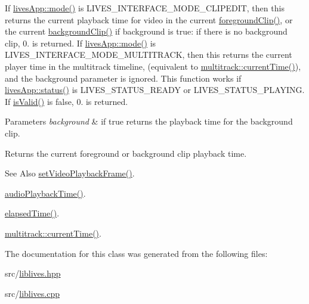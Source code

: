 If \hyperlink{classlives_1_1livesApp_aafa7b7f9c2666d097d0413e84bf4eccc}{lives\-App\-::mode()} is L\-I\-V\-E\-S\-\_\-\-I\-N\-T\-E\-R\-F\-A\-C\-E\-\_\-\-M\-O\-D\-E\-\_\-\-C\-L\-I\-P\-E\-D\-I\-T, then this returns the current playback time for video in the current \hyperlink{classlives_1_1player_ac365200b225c69e8cbd8e4ce7f48babb}{foreground\-Clip()}, or the current \hyperlink{classlives_1_1player_a1a9bacebdfc790dba3f5d54353dee462}{background\-Clip()} if background is true\-: if there is no background clip, 0. is returned. If \hyperlink{classlives_1_1livesApp_aafa7b7f9c2666d097d0413e84bf4eccc}{lives\-App\-::mode()} is L\-I\-V\-E\-S\-\_\-\-I\-N\-T\-E\-R\-F\-A\-C\-E\-\_\-\-M\-O\-D\-E\-\_\-\-M\-U\-L\-T\-I\-T\-R\-A\-C\-K, then this returns the current player time in the multitrack timeline, (equivalent to \hyperlink{classlives_1_1multitrack_a30f00aaa45426e7035cab06878481ccb}{multitrack\-::current\-Time()}), and the background parameter is ignored. This function works if \hyperlink{classlives_1_1livesApp_afcb05464af9146f5efbb896f2611c8e7}{lives\-App\-::status()} is L\-I\-V\-E\-S\-\_\-\-S\-T\-A\-T\-U\-S\-\_\-\-R\-E\-A\-D\-Y or L\-I\-V\-E\-S\-\_\-\-S\-T\-A\-T\-U\-S\-\_\-\-P\-L\-A\-Y\-I\-N\-G. If \hyperlink{classlives_1_1player_a0902fd78a0c6b8018e1d505acabbfd68}{is\-Valid()} is false, 0. is returned. 
\begin{DoxyParams}{Parameters}
{\em background} & if true returns the playback time for the background clip. \\
\hline
\end{DoxyParams}
\begin{DoxyReturn}{Returns}
the current foreground or background clip playback time. 
\end{DoxyReturn}
\begin{DoxySeeAlso}{See Also}
\hyperlink{classlives_1_1player_ac565890c405838785db44093735e9283}{set\-Video\-Playback\-Frame()}. 

\hyperlink{classlives_1_1player_a6a3edffe9d14bd5b9bc3a3f0a60dc3b0}{audio\-Playback\-Time()}. 

\hyperlink{classlives_1_1player_a412c342ef5220bafba0c479e9ef9111f}{elapsed\-Time()}. 

\hyperlink{classlives_1_1multitrack_a30f00aaa45426e7035cab06878481ccb}{multitrack\-::current\-Time()}. 
\end{DoxySeeAlso}


The documentation for this class was generated from the following files\-:\begin{DoxyCompactItemize}
\item 
src/\hyperlink{liblives_8hpp}{liblives.\-hpp}\item 
src/\hyperlink{liblives_8cpp}{liblives.\-cpp}\end{DoxyCompactItemize}
